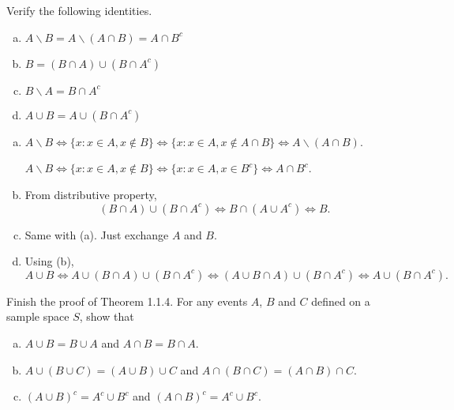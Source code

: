 \documentclass[12pt]{elegantbook}
\begin{document}

\chapter{}

\setcounter{exer}{1}
\begin{exercise}
    Verify the following identities. 
    \begin{enumerate}[(a)]
        \item $A\backslash B=A\backslash (A\cap B)=A\cap B^c$
        \item $B=(B\cap A)\cup (B\cap A^c)$
        \item $B\backslash A=B\cap A^c$
        \item $A\cup B=A\cup (B\cap A^c)$
    \end{enumerate}
\end{exercise}

\begin{solution}
    \begin{enumerate}[(a)]
        \item $A\backslash B \Leftrightarrow \{x: x\in A, x\notin B\}\Leftrightarrow \{x:x\in A, x\notin A\cap B\}\Leftrightarrow A\backslash (A\cap B)$. 
        
        $A\backslash B \Leftrightarrow \{x: x\in A, x\notin B\}\Leftrightarrow\{x:x\in A, x\in B^c\}\Leftrightarrow A\cap B^c$. 
        \item From distributive property, 
        \[
            (B\cap A)\cup (B\cap A^c) \Leftrightarrow B\cap (A\cup A^c)\Leftrightarrow B. 
        \]
        \item Same with (a). Just exchange $A$ and $B$. 
        \item Using (b), \[
            A\cup B\Leftrightarrow A\cup (B\cap A)\cup (B\cap A^c)\Leftrightarrow (A\cup B\cap A)\cup (B\cap A^c)\Leftrightarrow A\cup (B\cap A^c). 
        \]
    \end{enumerate}
\end{solution}

\begin{exercise}
    Finish the proof of Theorem 1.1.4. For any events $A$, $B$ and $C$ defined on a sample space $S$, show that
    \begin{enumerate}[(a)]
        \item $A\cup B=B\cup A$ and $A\cap B=B\cap A$. 
        \item $A\cup (B\cup C)=(A\cup B)\cup C$ and $A\cap (B\cap C)=(A\cap B)\cap C$. 
        \item $(A\cup B)^c=A^c\cup B^c$ and $(A\cap B)^c=A^c\cup B^c$. 
    \end{enumerate}
\end{exercise}
\end{document}
